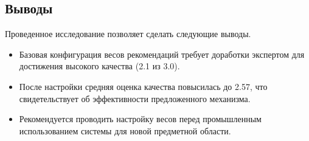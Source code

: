 \subsection*{Выводы}

Проведенное исследование позволяет сделать следующие выводы.

\begin{itemize}
\item Базовая конфигурация весов рекомендаций требует доработки экспертом для достижения высокого качества (2.1 из 3.0).
\item После настройки средняя оценка качества повысилась до 2.57, что свидетельствует об эффективности предложенного механизма.
\item Рекомендуется проводить настройку весов перед промышленным использованием системы для новой предметной области.
\end{itemize}